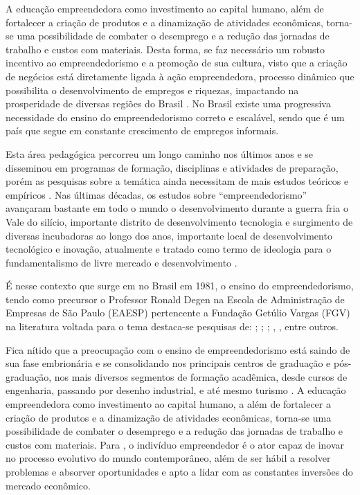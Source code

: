 A educação empreendedora como investimento ao capital humano, além de fortalecer a criação de produtos e a dinamização de atividades econômicas, torna-se uma possibilidade de combater o desemprego e a redução das jornadas de trabalho e custos com materiais. Desta forma, se faz necessário um robusto incentivo ao empreendedorismo e a promoção de sua cultura, visto que a criação de negócios está diretamente ligada à ação empreendedora, processo dinâmico que possibilita o desenvolvimento de empregos e riquezas, impactando na prosperidade de diversas regiões do Brasil  \cite{leite_aprendizagem_2015}. No Brasil existe uma progressiva necessidade do ensino do empreendedorismo correto e escalável, sendo que é um país que segue em constante crescimento de empregos informais.

Esta área pedagógica percorreu um longo caminho nos últimos anos e se disseminou em programas de formação, disciplinas e atividades de preparação, porém as pesquisas sobre a temática ainda necessitam de mais estudos teóricos e empíricos \cite{schaefer_educacao_2016-1}. Nas últimas décadas, os estudos sobre “empreendedorismo” avançaram bastante em todo o mundo o desenvolvimento durante a guerra fria o Vale do silício, importante distrito de desenvolvimento tecnologia e surgimento de diversas incubadoras ao longo dos anos, importante local de desenvolvimento tecnológico e inovação, atualmente e tratado como termo de ideologia para o fundamentalismo de livre mercado e desenvolvimento \cite{schradie_ideologia_2017}.

É nesse contexto que surge em no Brasil em 1981, o ensino do empreendedorismo, tendo como precursor o Professor Ronald Degen \cite{degen_o_1989} na Escola de Administração de Empresas de São Paulo (EAESP) pertencente a Fundação Getúlio Vargas (FGV) na literatura voltada para o tema destaca-se pesquisas de: ; ; ; , , entre outros. 


Fica nítido que a preocupação com o ensino de empreendedorismo está saindo de sua fase embrionária e se consolidando nos principais centros de graduação e pós-graduação, nos mais diversos segmentos de formação acadêmica, desde cursos de engenharia, passando por desenho industrial, e até mesmo turismo \cite{henrique_praticas_2008}. A educação empreendedora como investimento ao capital humano, a além de fortalecer a criação de produtos e a dinamização de atividades econômicas, torna-se uma possibilidade de combater o desemprego \cite{morais_empreendedorismo_2018} e a redução das jornadas de trabalho e custos com materiais. Para , o indivíduo empreendedor é o ator capaz de inovar no processo evolutivo do mundo contemporâneo, além de ser hábil a resolver problemas e absorver oportunidades e apto a lidar com as constantes inversões do mercado econômico. 

